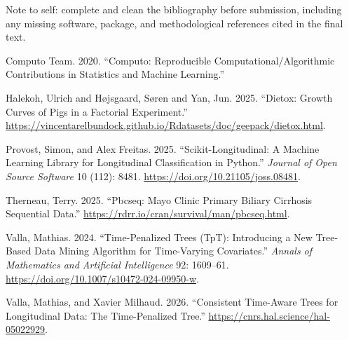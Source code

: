 \documentclass[
  letterpaper,
  DIV=11,
  numbers=noendperiod]{scrartcl}
\newlength{\cslhangindent}
\newenvironment{CSLReferences}[2] %
 {\begin{list}{}{%
  \setlength{\itemindent}{0pt}
  \setlength{\leftmargin}{0pt}
  \setlength{\parsep}{0pt}
  \ifodd #1
   \setlength{\leftmargin}{\cslhangindent}
   \setlength{\itemindent}{-1\cslhangindent}
  \fi
  \setlength{\itemsep}{#2\baselineskip}}}
 {\end{list}}
\begin{document}
{Note to self: complete and clean the bibliography before submission,
including any missing software, package, and methodological references
cited in the final text.}

\label{refs}
\begin{CSLReferences}{1}{0}
Computo Team. 2020. {``Computo: Reproducible Computational/Algorithmic
Contributions in Statistics and Machine Learning.''}

Halekoh, Ulrich and Højsgaard, Søren and Yan, Jun. 2025. {``Dietox:
Growth Curves of Pigs in a Factorial Experiment.''}
\url{https://vincentarelbundock.github.io/Rdatasets/doc/geepack/dietox.html}.

Provost, Simon, and Alex Freitas. 2025. {``Scikit-Longitudinal: A
Machine Learning Library for Longitudinal Classification in Python.''}
\emph{Journal of Open Source Software} 10 (112): 8481.
\url{https://doi.org/10.21105/joss.08481}.

Therneau, Terry. 2025. {``Pbcseq: Mayo Clinic Primary Biliary Cirrhosis
Sequential Data.''} \url{https://rdrr.io/cran/survival/man/pbcseq.html}.

Valla, Mathias. 2024. {``Time-Penalized Trees ({TpT}): Introducing a New
Tree-Based Data Mining Algorithm for Time-Varying Covariates.''}
\emph{Annals of Mathematics and Artificial Intelligence} 92: 1609--61.
\url{https://doi.org/10.1007/s10472-024-09950-w}.

Valla, Mathias, and Xavier Milhaud. 2026. {``Consistent Time-Aware Trees
for Longitudinal Data: The Time-Penalized Tree.''}
\url{https://cnrs.hal.science/hal-05022929}.

\end{CSLReferences}
\end{document}
